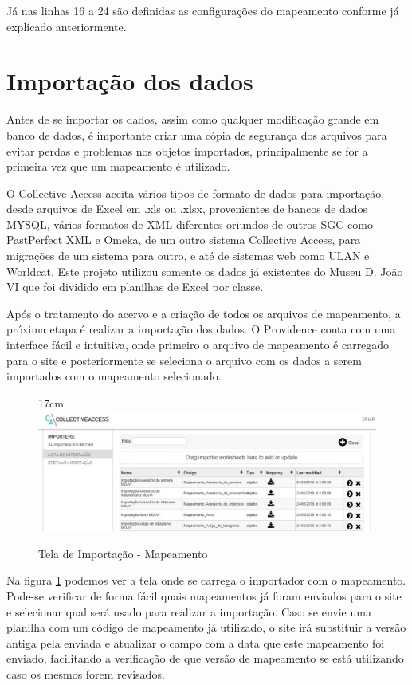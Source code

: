 \documentclass[a4paper,12pt,oneside,onecolumn,final,fleqn]{repUERJ}
\begin{document}
Já nas linhas 16 a 24 são definidas as configurações do mapeamento conforme já explicado anteriormente.

\section{Importação dos dados}

Antes de se importar os dados, assim como qualquer modificação grande em banco de dados, é importante criar uma cópia de segurança dos arquivos para evitar perdas e problemas nos objetos importados, principalmente se for a primeira vez que um mapeamento é utilizado.

O Collective Access aceita vários tipos de formato de dados para importação, desde arquivos de Excel em .xls ou .xlsx, provenientes de bancos de dados MYSQL, vários formatos de XML diferentes oriundos de outros SGC como PastPerfect XML e Omeka, de um outro sistema Collective Access, para migrações de um sistema para outro, e até de sistemas web como ULAN e Worldcat. Este projeto utilizou somente os dados já existentes do Museu D. João VI que foi dividido em planilhas de Excel por classe.

Após o tratamento do acervo e a criação de todos os arquivos de mapeamento, a próxima etapa é realizar a importação dos dados. O Providence conta com uma interface fácil e intuitiva, onde primeiro o arquivo de mapeamento é carregado para o site e posteriormente se seleciona o arquivo com os dados a serem importados com o mapeamento selecionado.

\begin{figure}[!ht]{17cm}
	\includegraphics[width=15cm, left]{figuras/tela_map.jpg}
	\caption{Tela de Importação - Mapeamento} \label{fig:mapeamento}
\end{figure}

Na figura \ref{fig:mapeamento} podemos ver a tela onde se carrega o importador com o mapeamento. Pode-se verificar de forma fácil quais mapeamentos já foram enviados para o site e selecionar qual será usado para realizar a importação. Caso se envie uma planilha com um código de mapeamento já utilizado, o site irá substituir a versão antiga pela enviada e atualizar o campo com a data que este mapeamento foi enviado, facilitando a verificação de que versão de mapeamento se está utilizando caso os mesmos forem revisados.
\end{document}
